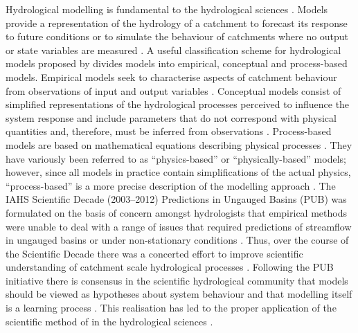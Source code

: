 \documentclass{icldt}\usepackage[]{graphicx}\usepackage[]{color}
\begin{document}
Hydrological modelling is fundamental to the hydrological sciences \citep{buytaert2008}. Models provide a representation of the hydrology of a catchment to forecast its response to future conditions or to simulate the behaviour of catchments where no output or state variables are measured \citep{beven2001}. A useful classification scheme for hydrological models proposed by \citet{wheater1993} divides models into empirical, conceptual and process-based models. Empirical models seek to characterise aspects of catchment behaviour from observations of input and output variables \citep{wheater2002,pechlivanidis2011}. Conceptual models consist of simplified representations of the hydrological processes perceived to influence the system response and include parameters that do not correspond with physical quantities and, therefore, must be inferred from observations \citep{kavetski2006}. Process-based models are based on mathematical equations describing physical processes \citep{montanari2012,beven2013-a}. They have variously been referred to as ``physics-based'' or ``physically-based'' models; however, since all models in practice contain simplifications of the actual physics, ``process-based'' is a more precise description of the modelling approach \citep{montanari?}. The IAHS Scientific Decade (2003--2012) Predictions in Ungauged Basins (PUB) was formulated on the basis of concern amongst hydrologists that empirical methods were unable to deal with a range of issues that required predictions of streamflow in ungauged basins or under non-stationary conditions \citep{sivapalan2003}. Thus, over the course of the Scientific Decade there was a concerted effort to improve scientific understanding of catchment scale hydrological processes \citep{hrachowitz2013}. Following the PUB initiative there is consensus in the scientific hydrological community that models should be viewed as hypotheses about system behaviour and that modelling itself is a learning process \citep{hrachowitz2013}. This realisation has led to the proper application of the scientific method of \citet{popper1959} in the hydrological sciences \citep[e.g.][]{buytaert2011}. \\
\end{document}
